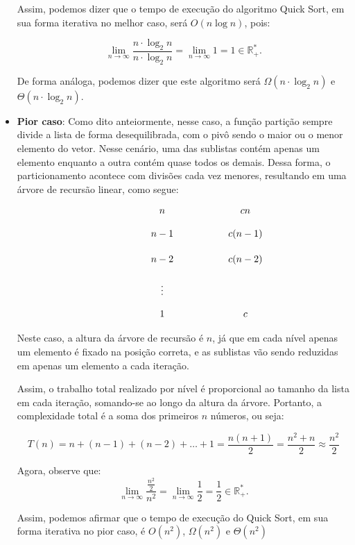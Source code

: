 \begin{itemize}
	      Assim, podemos dizer que o tempo de execução do algoritmo Quick Sort, em sua forma iterativa no melhor caso, será \( O(n \log n) \), pois:

	      \[
		      \lim_{n \rightarrow \infty} \frac{n \cdot \log_2 n}{n \cdot \log_2 n} =
		      \lim_{n \rightarrow \infty} 1 =
		      1 \in \mathbb{R}^*_+.
	      \]

	      De forma análoga, podemos dizer que este algoritmo será \( \Omega(n \cdot \log_2 n) \) e \( \Theta(n \cdot \log_2 n) \).


	\item \textbf{Pior caso}: Como dito anteiormente, nesse caso, a função partição sempre divide a lista de forma desequilibrada, com o pivô sendo o maior ou o menor elemento do vetor. Nesse cenário, uma das sublistas contém apenas um elemento enquanto a outra contém quase todos os demais. Dessa forma, o particionamento acontece com divisões cada vez menores, resultando em uma árvore de recursão linear, como segue:

	      \[
		      \begin{tikzcd}[sep=small]
			      &&&& n &&&& cn \\
			      &&&& {n - 1} &&&& {c(n - 1)} \\
			      &&&& {n - 2} &&&& {c(n - 2)} \\
			      &&&& \vdots \\
			      &&&& 1 &&&& c
		      \end{tikzcd}
	      \]

	      Neste caso, a altura da árvore de recursão é \( n \), já que em cada nível apenas um elemento é fixado na posição correta, e as sublistas vão sendo reduzidas em apenas um elemento a cada iteração.

	      Assim, o trabalho total realizado por nível é proporcional ao tamanho da lista em cada iteração, somando-se ao longo da altura da árvore. Portanto, a complexidade total é a soma dos primeiros \( n \) números, ou seja:

	      \[
		      T(n) = n + (n - 1) + (n - 2) + \dots + 1 = \frac{n(n + 1)}{2} = \frac{n^2 + n}{2} \approx \frac{n^2}{2}
	      \]

	      Agora, observe que:
	      \[
		      \lim_{n \rightarrow \infty} \frac{\frac{n^2}{2}}{n^2} =
		      \lim_{n \rightarrow \infty} \frac{1}{2} =
		      \frac{1}{2} \in \mathbb{R}^*_+.
	      \]

	      Assim, podemos afirmar que o tempo de execução do Quick Sort, em sua forma iterativa no pior caso, é \( O(n^2) \), \( \Omega(n^2) \) e \( \Theta(n^2) \)


\end{itemize}
